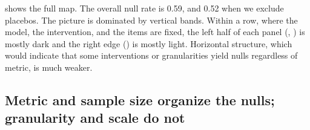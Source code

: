  shows the full map.
The overall null rate is 0.59, and 0.52 when we exclude placebos.
The picture is dominated by vertical bands.
Within a row, where the model, the intervention, and the items are fixed, the left half of each panel (\msample, \mgreedy) is mostly dark and the right edge (\mlogit) is mostly light.
Horizontal structure, which would indicate that some interventions or granularities yield nulls regardless of metric, is much weaker.

\subsection{Metric and sample size organize the nulls; granularity and scale do not}

\begin{table}[t]
    \centering
    \caption{Marginal null rates by design feature, with 95\% cluster-bootstrap CIs over the 44 units. The lowest null rate in each row is in \textbf{bold}. The smallest $p$-value that 5000 permutations can produce is 0.0002. The last column gives each feature's share of cell-level variance in null rate.}
    \label{tab:marginals}
\end{table}

